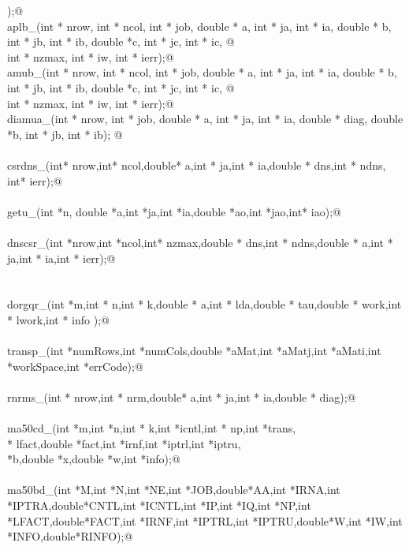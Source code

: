 \documentclass[12pt]{article}
\begin{document}
\begin{flushleft}
\begin{minipage}{\linewidth}
\begin{list}{}{}
\mbox{}\verb@                );@\\
\mbox{}\verb@int aplb_(int * nrow, int * ncol, int * job, double * a, int * ja, int * ia, double * b, int * jb, int * ib, double *c, int * jc, int * ic, @\\
\mbox{}\verb@        int * nzmax, int * iw, int * ierr);@\\
\mbox{}\verb@int amub_(int * nrow, int * ncol, int * job, double * a, int * ja, int * ia, double * b, int * jb, int * ib, double *c, int * jc, int * ic, @\\
\mbox{}\verb@        int * nzmax, int * iw, int * ierr);@\\
\mbox{}\verb@int diamua_(int * nrow,  int * job, double * a, int * ja, int * ia, double * diag, double *b, int * jb, int * ib); @\\
\mbox{}\verb@@\\
\mbox{}\verb@int csrdns_(int* nrow,int* ncol,double* a,int * ja,int * ia,double * dns,int * ndns, int* ierr);@\\
\mbox{}\verb@@\\
\mbox{}\verb@int getu_(int *n, double *a,int *ja,int *ia,double *ao,int *jao,int* iao);@\\
\mbox{}\verb@@\\
\mbox{}\verb@int dnscsr_(int *nrow,int *ncol,int* nzmax,double * dns,int * ndns,double * a,int * ja,int * ia,int * ierr);@\\
\mbox{}\verb@@\\
\mbox{}\verb@@\\
\mbox{}\verb@void dorgqr_(int *m,int * n,int * k,double * a,int * lda,double * tau,double * work,int * lwork,int * info );@\\
\mbox{}\verb@@\\
\mbox{}\verb@void transp_(int *numRows,int *numCols,double *aMat,int *aMatj,int *aMati,int *workSpace,int *errCode);@\\
\mbox{}\verb@@\\
\mbox{}\verb@int rnrms_(int * nrow,int * nrm,double* a,int * ja,int * ia,double * diag);@\\
\mbox{}\verb@@\\
\mbox{}\verb@void ma50cd_(int *m,int *n,int * k,int *icntl,int * np,int *trans,\@\\
\mbox{}\verb@int * lfact,double *fact,int *irnf,int *iptrl,int *iptru,\@\\
\mbox{}\verb@double *b,double *x,double *w,int *info);@\\
\mbox{}\verb@@\\
\mbox{}\verb@void ma50bd_(int *M,int *N,int *NE,int *JOB,double*AA,int *IRNA,int *IPTRA,double*CNTL,int *ICNTL,int *IP,int *IQ,int *NP,int *LFACT,double*FACT,int *IRNF,int *IPTRL,int *IPTRU,double*W,int *IW,int *INFO,double*RINFO);@\\

\end{list}
\end{minipage}
\end{flushleft}
\end{document}
